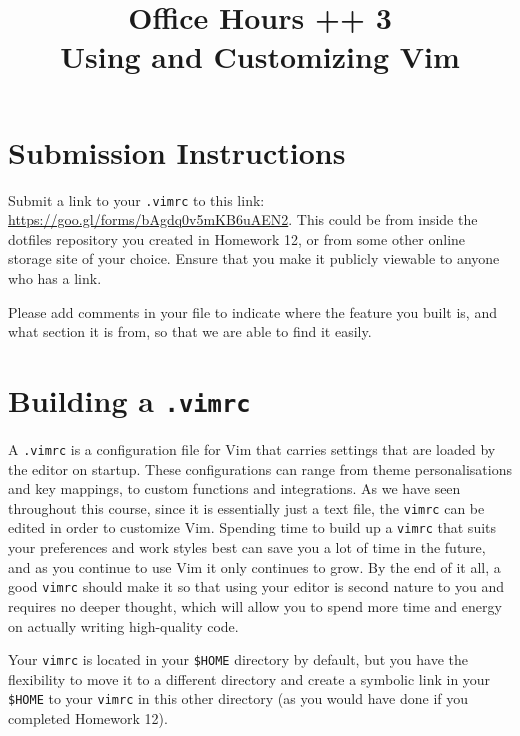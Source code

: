 \documentclass{article}
\begin{document}
\fancyfoot[C]{\color{gray} \thepage~/~\pageref*{LastPage}}
\pagestyle{fancyplain}

\title{\textbf{Office Hours ++ 3\\Using and Customizing Vim}}
\author{\textbf{\color{red}{Due: Monday, April 2nd, 11:59PM (Hard Deadline)}}}
\date{}
\maketitle


\section*{Submission Instructions}
Submit a link to your \texttt{.vimrc} to this link:
\url{https://goo.gl/forms/bAgdq0v5mKB6uAEN2}. This could be from inside the dotfiles repository you created in Homework
12, or from some other online storage site of your choice. Ensure that you make it publicly viewable to
anyone who has a link.

Please add comments in your file to indicate where the feature you built is, and what section it is from, so
that we are able to find it easily. 

\section{Building a \texttt{.vimrc}}
A \texttt{.vimrc} is a configuration file for Vim that carries settings that are loaded by the editor on startup. These
configurations can range from theme personalisations and key mappings, to custom functions and integrations. As we have
seen throughout this course, since it is essentially just a text file, the \texttt{vimrc} can be edited in order to
customize Vim. Spending time to build up a \texttt{vimrc} that suits your preferences and work styles best can save you
a lot of time in the future, and as you continue to use Vim it only continues to grow. By the end of it all, a good
\texttt{vimrc} should make it so that using your editor is second nature to you and requires no deeper thought, which
will allow you to spend more time and energy on actually writing high-quality code.

Your \texttt{vimrc} is located in your \texttt{\$HOME} directory by default, but you have the flexibility
to move it to a different directory and create a symbolic link in your \texttt{\$HOME} to your \texttt{vimrc} in this
other directory (as you would have done if you completed Homework 12).
\end{document}
